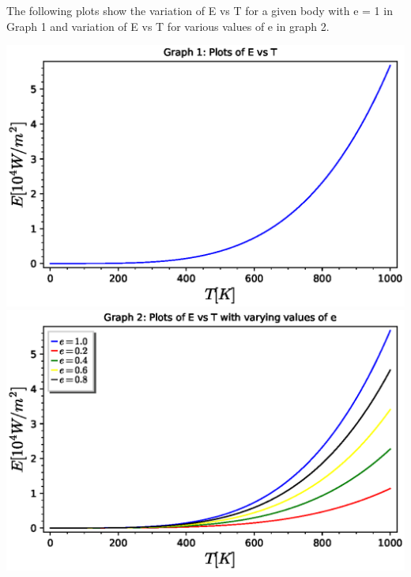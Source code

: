 The following plots show the variation of E vs T for a given body with e = 1 in Graph 1 and variation of E vs T for various values of e in graph 2.

\includegraphics[scale=0.6]{jan-may-2022-latex/AE21B107/EvsT.eps}
\includegraphics[scale=0.6]{jan-may-2022-latex/AE21B107/variable_e.eps}

